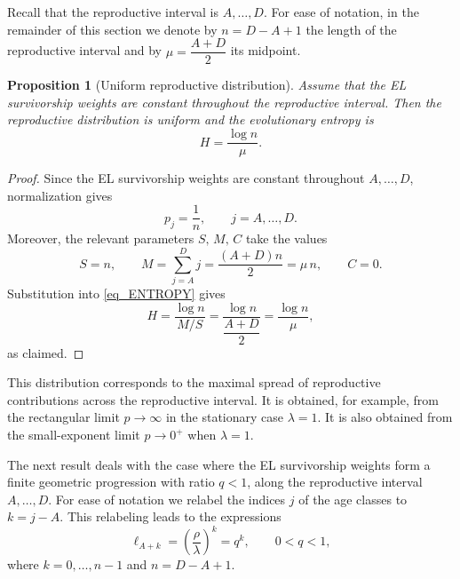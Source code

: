 \documentclass[10pt,a4paper]{amsart}
\newtheorem{prop}[thm]{Proposition}
\theoremstyle{definition}
\theoremstyle{remark}
\numberwithin{equation}{section}
\begin{document}
%


Recall that the reproductive interval is $A,\ldots, D$. 
For ease of notation, in the remainder of this section we denote by $n=D-A+1$
the length of the reproductive interval and by $\mu = \dfrac{A+D}{2}$ its midpoint.

\begin{prop}[Uniform reproductive distribution]
	\label{prop_uniform}
Assume that the EL survivorship weights are constant
throughout the reproductive interval. Then the
reproductive distribution is uniform and the evolutionary entropy is
\begin{equation}
\label{eq_Type_I_entropy}
H
=\frac{
\log n
}{ \mu}.
\end{equation}
\end{prop}

\begin{proof}
Since the EL survivorship weights are constant throughout
\(A,\dots,D\), normalization gives
\[
p_j=\frac1n,
\qquad j=A,\dots,D.
\]
Moreover, the relevant parameters $S, \, M, \,  C$ take the values
\[
S=n,
\qquad
M=\sum_{j=A}^{D}j
=
\frac{(A+D)n}{2} = \mu \, n,
\qquad
C=0.
\]
Substitution into \eqref{eq_ENTROPY} gives
\[
H
=
\frac{\log n}{M/S}
=
\frac{
\log n
}{
\dfrac{A+D}{2} 
} = \frac{\log n}{\mu},
\]
as claimed.
\end{proof}

This distribution corresponds to the maximal spread of
reproductive contributions across the reproductive interval.
It is obtained, for example, from the rectangular limit
\(p\to\infty\) in the stationary case \(\lambda=1\). It is
also obtained from the small-exponent limit \(p\to0^+\)
when \(\lambda=1\).

The next result deals with the case where the
EL survivorship weights form a finite geometric progression with ratio \(q <1\), along the reproductive interval \(A,\dots,D\).
For ease of notation we relabel the indices $j$ of the age classes to $k=j-A$.
This relabeling leads to the expressions
\begin{equation}
	\ell_{A+k}
	=
	\left(
	\frac{\rho}{\lambda}
	\right)^k=q^k,
	\qquad
	0<q<1,
	\label{eq:typeII_survivorship}
\end{equation}
where $k=0,\ldots,n-1$ and $n=D-A+1.$
\end{document}
